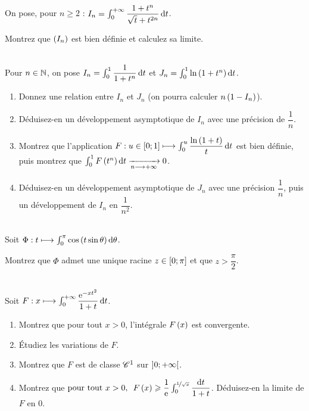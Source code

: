 \begin{exo}~\\
On pose, pour \(n\geq2\) : \(I_n=\int_0^{\pinf}\dfrac{1+t^n}{\sqrt{t}+t^{2n}}\odif{t}\).

Montrez que \(\left(I_n\right)\) est bien définie et calculez sa limite.
\end{exo}

\begin{exo}~\\
Pour \(n\in\mathbb{N}\), on pose \(I_n=\int_0^1\dfrac{1}{1+t^n}\odif{t}\) et \(J_n=\int_0^1\ln\paren{1+t^n}\odif{t}\).

\begin{enumerate}
    \item Donnez une relation entre \(I_n\) et \(J_n\) (on pourra calculer \(n\left(1-I_n\right)\)). \\
    \item Déduisez-en un développement asymptotique de \(I_n\) avec une précision de \(\dfrac{1}{n}\). \\
    \item Montrez que l'application \(F:u\in\intervii{0}{1}\mapsto\int_0^u\dfrac{\ln\paren{1+t}}{t}\odif{t}\) est bien définie, puis montrez que \(\int_0^1F\paren{t^n}\odif{t}\tendqd{n\to\pinf}0\). \\
    \item Déduisez-en un développement asymptotique de \(J_n\) avec une précision \(\dfrac{1}{n}\), puis un développement de \(I_n\) en \(\dfrac{1}{n^2}\).
\end{enumerate}
\end{exo}

\begin{exo}~\\
Soit \(\Phi:t\mapsto\int_0^\pi\cos\paren{t\sin\theta}\odif{\theta}\).

Montrez que \(\Phi\) admet une unique racine \(z\in\left[0;\pi\right]\) et que \(z>\dfrac{\pi}{2}\).
\end{exo}

\begin{exo}~\\
Soit \(F:x\mapsto\int_0^{\pinf}\dfrac{\e{-xt^2}}{1+t}\odif{t}\).

\begin{enumerate}
    \item Montrez que pour tout \(x>0\), l'intégrale \(F\left(x\right)\) est convergente. \\
    \item Étudiez les variations de \(F\). \\
    \item Montrez que \(F\) est de classe \(\mathscr{C}^{1}\) sur \(\left]0;+\infty\right[\). \\
    \item Montrez que \(\quantifs{\tpt x>0}F\paren{x}\geq\dfrac{1}{\e{}}\int_0^{\nicefrac{1}{\sqrt{x}}}\dfrac{\odif{t}}{1+t}\). Déduisez-en la limite de \(F\) en \(0\).
\end{enumerate}
\end{exo}

